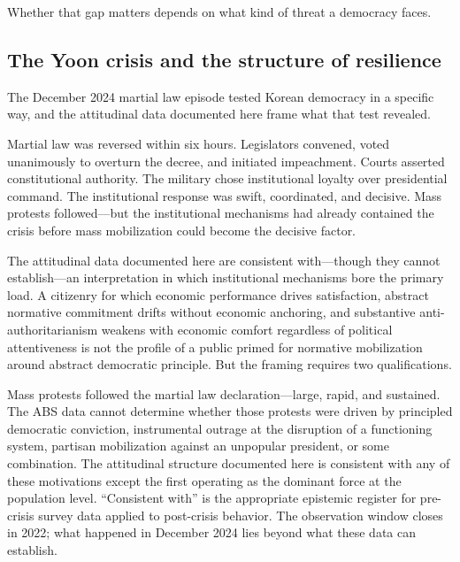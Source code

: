 \documentclass[
  12pt,
  12pt,
  letterpaper]{article}
\begin{document}
Whether that gap matters depends on what kind of threat a democracy
faces.

\subsection{The Yoon crisis and the structure of
resilience}\label{the-yoon-crisis-and-the-structure-of-resilience}

The December 2024 martial law episode tested Korean democracy in a
specific way, and the attitudinal data documented here frame what that
test revealed.

Martial law was reversed within six hours. Legislators convened, voted
unanimously to overturn the decree, and initiated impeachment. Courts
asserted constitutional authority. The military chose institutional
loyalty over presidential command. The institutional response was swift,
coordinated, and decisive. Mass protests followed---but the
institutional mechanisms had already contained the crisis before mass
mobilization could become the decisive factor.

The attitudinal data documented here are consistent with---though they
cannot establish---an interpretation in which institutional mechanisms
bore the primary load. A citizenry for which economic performance drives
satisfaction, abstract normative commitment drifts without economic
anchoring, and substantive anti-authoritarianism weakens with economic
comfort regardless of political attentiveness is not the profile of a
public primed for normative mobilization around abstract democratic
principle. But the framing requires two qualifications.

Mass protests followed the martial law declaration---large, rapid, and
sustained. The ABS data cannot determine whether those protests were
driven by principled democratic conviction, instrumental outrage at the
disruption of a functioning system, partisan mobilization against an
unpopular president, or some combination. The attitudinal structure
documented here is consistent with any of these motivations except the
first operating as the dominant force at the population level.
``Consistent with'' is the appropriate epistemic register for pre-crisis
survey data applied to post-crisis behavior. The observation window
closes in 2022; what happened in December 2024 lies beyond what these
data can establish.
\end{document}
